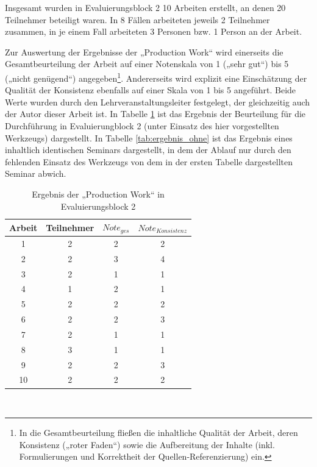 Insgesamt wurden in Evaluierungsblock 2 10 Arbeiten erstellt, an denen 20 Teilnehmer beteiligt waren. In 8 Fällen arbeiteten jeweils 2 Teilnehmer zusammen, in je einem Fall arbeiteten 3 Personen bzw. 1 Person an der Arbeit.

Zur Auswertung der Ergebnisse der „Production Work“ wird einerseits die Gesamtbeurteilung der Arbeit auf einer Notenskala von 1 („sehr gut“) bis 5 („nicht genügend“) angegeben\footnote{In die Gesamtbeurteilung fließen die inhaltliche Qualität der Arbeit, deren Konsistenz („roter Faden“) sowie die Aufbereitung der Inhalte (inkl. Formulierungen und Korrektheit der Quellen-Referenzierung) ein.}. Andererseits wird explizit eine Einschätzung der Qualität der Konsistenz ebenfalls auf einer Skala von 1 bis 5 angeführt. Beide Werte wurden durch den Lehrveranstaltungsleiter festgelegt, der gleichzeitig auch der Autor dieser Arbeit ist. In Tabelle \ref{tab:ergebnis} ist das Ergebnis der Beurteilung für die Durchführung in Evaluierungblock 2 (unter Einsatz des hier vorgestellten Werkzeugs) dargestellt. In Tabelle \ref{tab:ergebnis_ohne} ist das Ergebnis eines inhaltlich identischen Seminars dargestellt, in dem der Ablauf nur durch den fehlenden Einsatz des Werkzeugs von dem in der ersten Tabelle dargestellten Seminar abwich. 

\begin{table}[htbp]
	\centering
	\caption{Ergebnis der „Production Work“ in Evaluierungsblock 2}

\begin{tabular}{| c || c || c | c |}
  \hline
   Arbeit & Teilnehmer & $Note_{ges}$ & $Note_{Konsistenz}$ \\ \hline
   1         & 2 & 2 & 2 \\ 
   2         & 2 & 3 & 4 \\ 
   3         & 2 & 1 & 1 \\ 
   4         & 1 & 2 & 1 \\ 
   5         & 2 & 2 & 2 \\ 
   6         & 2 & 2 & 3 \\ 
   7         & 2 & 1 & 1 \\ 
   8         & 3 & 1 & 1 \\ 
   9         & 2 & 2 & 3 \\ 
   10        & 2 & 2 & 2 \\ \hline
\end{tabular} \\ 
	\label{tab:ergebnis}
\end{table}

